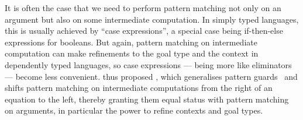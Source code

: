 It is often the case that we need to perform pattern matching not only on an argument but also on some intermediate computation.
In simply typed languages, this is usually achieved by ``case expressions'', a special case being if-then-else expressions for booleans.
But again, pattern matching on intermediate computation can make refinements to the goal type and the context in dependently typed languages, so case expressions --- being more like eliminators --- become less convenient.
\citet{McBride-view} thus proposed , which generalises pattern guards~\citep{PJ-guards} and shifts pattern matching on intermediate computations from the right of an equation to the left, thereby granting them equal status with pattern matching on arguments, in particular the power to refine contexts and goal types.

